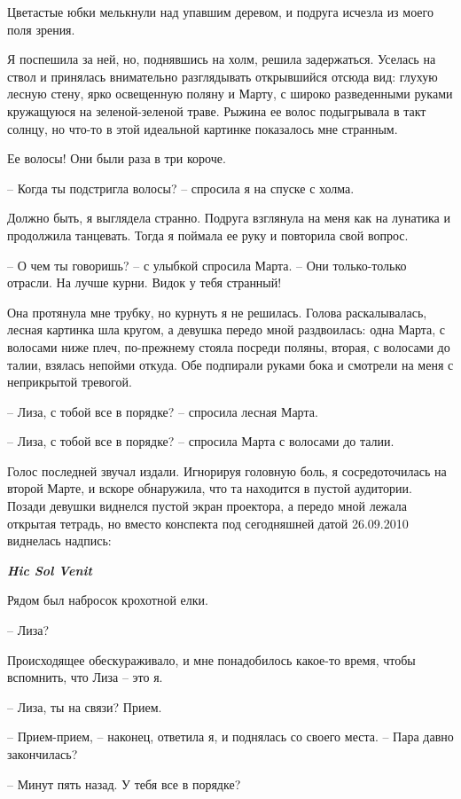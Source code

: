 \documentclass[
]{book}
\begin{document}
Цветастые юбки мелькнули над упавшим деревом, и подруга исчезла из моего поля зрения.

Я поспешила за ней, но, поднявшись на холм, решила задержаться. Уселась на ствол и принялась внимательно разглядывать открывшийся отсюда вид: глухую лесную стену, ярко освещенную поляну и Марту, с широко разведенными руками кружащуюся на зеленой-зеленой траве. Рыжина ее волос подыгрывала в такт солнцу, но что-то в этой идеальной картинке показалось мне странным.

Ее волосы! Они были раза в три короче.

-- Когда ты подстригла волосы? -- спросила я на спуске с холма.

Должно быть, я выглядела странно. Подруга взглянула на меня как на лунатика и продолжила танцевать. Тогда я поймала ее руку и повторила свой вопрос.

-- О чем ты говоришь? -- с улыбкой спросила Марта. -- Они только-только отрасли. На лучше курни. Видок у тебя странный!

Она протянула мне трубку, но курнуть я не решилась. Голова раскалывалась, лесная картинка шла кругом, а девушка передо мной раздвоилась: одна Марта, с волосами ниже плеч, по-прежнему стояла посреди поляны, вторая, с волосами до талии, взялась непойми откуда. Обе подпирали руками бока и смотрели на меня с неприкрытой тревогой.

-- Лиза, с тобой все в порядке? -- спросила лесная Марта.

-- Лиза, с тобой все в порядке? -- спросила Марта с волосами до талии.

Голос последней звучал издали. Игнорируя головную боль, я сосредоточилась на второй Марте, и вскоре обнаружила, что та находится в пустой аудитории. Позади девушки виднелся пустой экран проектора, а передо мной лежала открытая тетрадь, но вместо конспекта под сегодняшней датой 26.09.2010 виднелась надпись:

\emph{\textbf{Hic Sol Venit}}

Рядом был набросок крохотной елки.

-- Лиза?

Происходящее обескураживало, и мне понадобилось какое-то время, чтобы вспомнить, что Лиза -- это я.

-- Лиза, ты на связи? Прием.

-- Прием-прием, -- наконец, ответила я, и поднялась со своего места. -- Пара давно закончилась?

-- Минут пять назад. У тебя все в порядке?
\end{document}
